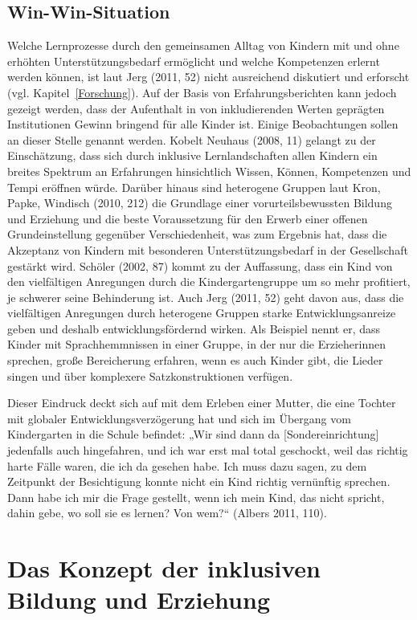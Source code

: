 \subsection{Win-Win-Situation}
Welche Lernprozesse durch den gemeinsamen Alltag von Kindern mit und ohne erhöhten Unterstützungsbedarf ermöglicht und welche Kompetenzen erlernt werden können, ist laut Jerg (2011, 52) nicht ausreichend diskutiert und erforscht (vgl. Kapitel~\ref{Forschung}).
Auf der Basis von Erfahrungsberichten kann jedoch gezeigt werden, dass der Aufenthalt in von inkludierenden Werten geprägten Institutionen Gewinn bringend für alle Kinder ist. Einige Beobachtungen sollen an dieser Stelle genannt werden. 
Kobelt Neuhaus (2008, 11) gelangt zu der Einschätzung, dass sich durch inklusive Lernlandschaften allen Kindern ein breites Spektrum an Erfahrungen hinsichtlich Wissen, Können, Kompetenzen und Tempi eröffnen würde. 
Darüber hinaus sind heterogene Gruppen laut Kron, Papke, Windisch (2010, 212) die Grundlage einer vorurteilsbewussten Bildung und Erziehung und die beste Voraussetzung für den Erwerb einer offenen Grundeinstellung gegenüber Verschiedenheit, was zum Ergebnis hat, dass die Akzeptanz von Kindern mit besonderen Unterstützungsbedarf in der Gesellschaft gestärkt wird.  
Schöler (2002, 87) kommt zu der Auffassung, dass ein Kind von den vielfältigen Anregungen durch die Kindergartengruppe um so mehr profitiert, je schwerer seine Behinderung ist. 
Auch Jerg (2011, 52) geht davon aus, dass die vielfältigen Anregungen durch heterogene Gruppen starke Entwicklungsanreize geben und deshalb entwicklungsfördernd wirken. Als Beispiel nennt er, dass Kinder mit Sprachhemmnissen in einer Gruppe, in der nur die Erzieherinnen sprechen, große Bereicherung erfahren, wenn es auch Kinder gibt, die Lieder singen und über komplexere Satzkonstruktionen verfügen.

Dieser Eindruck deckt sich auf mit dem Erleben einer Mutter, die eine Tochter mit globaler Entwicklungsverzögerung hat und sich im Übergang vom Kindergarten in die Schule befindet: 
„Wir sind dann da [Sondereinrichtung] jedenfalls auch hingefahren, und ich war erst mal total geschockt, weil das richtig harte Fälle waren, die ich da gesehen habe. Ich muss dazu sagen, zu dem Zeitpunkt der Besichtigung konnte nicht ein Kind richtig vernünftig sprechen. Dann habe ich mir die Frage gestellt, wenn ich mein Kind, das nicht spricht, dahin gebe, wo soll sie es lernen? Von wem?“ (Albers 2011, 110).

\section{Das Konzept der inklusiven Bildung und Erziehung}\label{sec:Inklusionsverstandnis}

